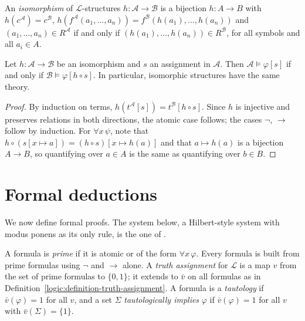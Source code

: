 \begin{definition}\label{logic:definition-isomorphism-structures}
An \emph{isomorphism} of $\mathcal{L}$-structures
$h \colon \mathcal{A} \to \mathcal{B}$ is a bijection $h \colon A \to B$ with
$h(c^{\mathcal{A}}) = c^{\mathcal{B}}$,
$h(f^{\mathcal{A}}(a_1, \ldots, a_n)) = f^{\mathcal{B}}(h(a_1), \ldots, h(a_n))$
and $(a_1, \ldots, a_n) \in R^{\mathcal{A}}$ if and only if
$(h(a_1), \ldots, h(a_n)) \in R^{\mathcal{B}}$, for all symbols and all
$a_i \in A$.
\end{definition}

\begin{proposition}\label{logic:proposition-isomorphism-invariance}
Let $h \colon \mathcal{A} \to \mathcal{B}$ be an isomorphism and $s$ an
assignment in $\mathcal{A}$. Then $\mathcal{A} \models \varphi[s]$ if and only
if $\mathcal{B} \models \varphi[h \circ s]$. In particular, isomorphic
structures have the same theory.
\end{proposition}

\begin{proof}
By induction on terms, $h(t^{\mathcal{A}}[s]) = t^{\mathcal{B}}[h \circ s]$.
Since $h$ is injective and preserves relations in both directions, the
atomic case follows; the cases $\neg$, $\to$ follow by induction. For
$\forall x\,\psi$, note that $h \circ (s[x \mapsto a]) = (h \circ s)[x \mapsto h(a)]$
and that $a \mapsto h(a)$ is a bijection $A \to B$, so quantifying over
$a \in A$ is the same as quantifying over $b \in B$.
\end{proof}

\section{Formal deductions}\label{logic:section-deductions}

We now define formal proofs. The system below, a Hilbert-style system with
modus ponens as its only rule, is the one of \cite{enderton-logic}.

\begin{definition}\label{logic:definition-first-order-tautology}
A formula is \emph{prime} if it is atomic or of the form $\forall x\,\varphi$.
Every formula is built from prime formulas using $\neg$ and $\to$ alone. A
\emph{truth assignment} for $\mathcal{L}$ is a map $v$ from the set of prime
formulas to $\{0, 1\}$; it extends to $\bar v$ on all formulas as in
Definition~\ref{logic:definition-truth-assignment}. A formula is a
\emph{tautology} if $\bar v(\varphi) = 1$ for all $v$, and a set $\Sigma$
\emph{tautologically implies} $\varphi$ if $\bar v(\varphi) = 1$ for all $v$
with $\bar v(\Sigma) = \{1\}$.
\end{definition}

